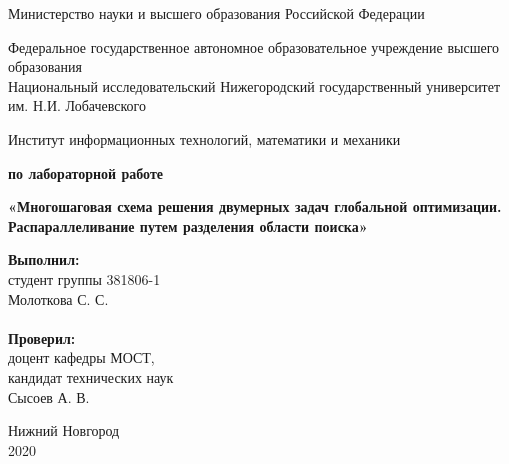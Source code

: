 \documentclass{report}
\begin{document}
	
	\begin{titlepage}
		
		\begin{center}
			Министерство науки и высшего образования Российской Федерации
		\end{center}
		
		\begin{center}
			Федеральное государственное автономное образовательное учреждение высшего образования \\
			Национальный исследовательский Нижегородский государственный университет им. Н.И. Лобачевского
		\end{center}
		
		\begin{center}
			Институт информационных технологий, математики и механики
		\end{center}
		
		\vspace{4em}
		
		\begin{center}
			\textbf{ по лабораторной работе} \\
		\end{center}
		\begin{center}
			\textbf{\Large«Многошаговая схема решения двумерных задач глобальной оптимизации. Распараллеливание путем разделения области поиска»} \\
		\end{center}
		
		\vspace{4em}
		
		\newbox{\lbox}
		\newlength{\maxl}
		\setlength{\maxl}{\wd\lbox}
		\hfill\parbox{7cm}{
			\hspace*{5cm}\hspace*{-5cm}\textbf{Выполнил:} \\ студент группы 381806-1 \\ Молоткова С. С.\\
			\\
			\hspace*{5cm}\hspace*{-5cm}\textbf{Проверил:}\\ доцент кафедры МОСТ, \\ кандидат технических наук \\ Сысоев А. В.\\
		}
		\vspace{\fill}
		
		\begin{center} Нижний Новгород \\ 2020 \end{center}
		
	\end{titlepage}
	
\end{document}
